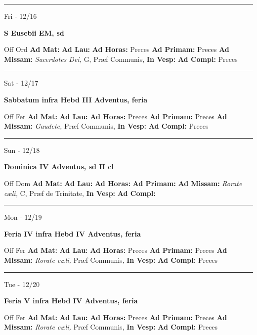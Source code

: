 \documentclass[letterpaper, 10pt]{article}
\begin{document}
\hrule
\begin{center}
Fri - 12/16
\end{center}\textbf{ \large S Eusebii EM, \textnormal{\normalsize sd}}
\begin{justify}
Off Ord
\textbf{Ad Mat: }
\textbf{Ad Lau: }
\textbf{Ad Horas: }Preces
\textbf{Ad Primam: }Preces
\textbf{Ad Missam:} \textit{Sacerdotes Dei, } G, Præf Communis, 
\textbf{In Vesp: }
\textbf{Ad Compl: }Preces\end{justify}



\hrule
\begin{center}
Sat - 12/17
\end{center}\textbf{ \large Sabbatum infra Hebd III Adventus, \textnormal{\normalsize feria}}
\begin{justify}
Off Fer
\textbf{Ad Mat: }
\textbf{Ad Lau: }
\textbf{Ad Horas: }Preces
\textbf{Ad Primam: }Preces
\textbf{Ad Missam:} \textit{Gaudete, } Præf Communis, 
\textbf{In Vesp: }
\textbf{Ad Compl: }Preces\end{justify}



\hrule
\begin{center}
Sun - 12/18
\end{center}\textbf{ \large Dominica IV Adventus, \textnormal{\normalsize sd II cl}}
\begin{justify}
Off Dom
\textbf{Ad Mat: }
\textbf{Ad Lau: }
\textbf{Ad Horas: }
\textbf{Ad Primam: }
\textbf{Ad Missam:} \textit{Rorate cæli, } C, Præf de Trinitate, 
\textbf{In Vesp: }
\textbf{Ad Compl: }\end{justify}



\hrule
\begin{center}
Mon - 12/19
\end{center}\textbf{ \large Feria IV infra Hebd IV Adventus, \textnormal{\normalsize feria}}
\begin{justify}
Off Fer
\textbf{Ad Mat: }
\textbf{Ad Lau: }
\textbf{Ad Horas: }Preces
\textbf{Ad Primam: }Preces
\textbf{Ad Missam:} \textit{Rorate cæli, } Præf Communis, 
\textbf{In Vesp: }
\textbf{Ad Compl: }Preces\end{justify}



\hrule
\begin{center}
Tue - 12/20
\end{center}\textbf{ \large Feria V infra Hebd IV Adventus, \textnormal{\normalsize feria}}
\begin{justify}
Off Fer
\textbf{Ad Mat: }
\textbf{Ad Lau: }
\textbf{Ad Horas: }Preces
\textbf{Ad Primam: }Preces
\textbf{Ad Missam:} \textit{Rorate cæli, } Præf Communis, 
\textbf{In Vesp: }
\textbf{Ad Compl: }Preces\end{justify}
\end{document}
